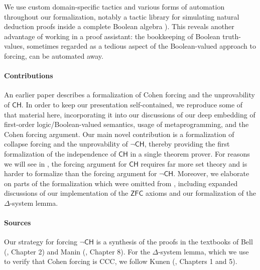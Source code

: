 \documentclass[sigplan,10pt,review]{acmart}
\newcommand{\ZFC}{\mathsf{ZFC}}
\newcommand{\CH}{\mathsf{CH}}
\theoremstyle{definition}
\begin{document}
We use custom domain-specific tactics and various forms of automation throughout our formalization, notably a tactic library for simulating natural deduction proofs inside a complete Boolean algebra ).
This reveals another advantage of working in a proof assistant: the bookkeeping of Boolean truth-values, sometimes regarded as a tedious aspect of the Boolean-valued approach to forcing, can be automated away.

\paragraph{Contributions}
An earlier paper \cite{DBLP:conf/itp/HanD19} describes a formalization of Cohen forcing and the unprovability of \(\CH\). In order to keep our presentation self-contained, %
we reproduce some of that material here, incorporating it into our discussions of our deep embedding of first-order logic/Boolean-valued semantics, usage of metaprogramming, and the Cohen forcing argument.
Our main novel contribution is a formalization of collapse forcing and the unprovability of \(\neg \CH\), thereby providing the first formalization of the independence of \(\CH\) in a single theorem prover. For reasons we will see in , the forcing argument for \(\CH\) requires far more set theory and is harder to formalize than the forcing argument for \(\neg \CH\). Moreover, we elaborate on parts of the formalization which were omitted from \cite{DBLP:conf/itp/HanD19}, including expanded discussions of our implementation of the \(\ZFC\) axioms and our formalization of the \(\Delta\)-system lemma.

\paragraph{Sources}
Our strategy for forcing \(\neg \CH\) is a synthesis of the proofs in the textbooks of Bell (\cite{bell2011set}, Chapter 2) and Manin (\cite{manin2009course}, Chapter 8).
For the $\Delta$-system lemma, which we use to verify that Cohen forcing is CCC, we follow Kunen (\cite{kunen2014set}, Chapters 1 and 5).
\end{document}

